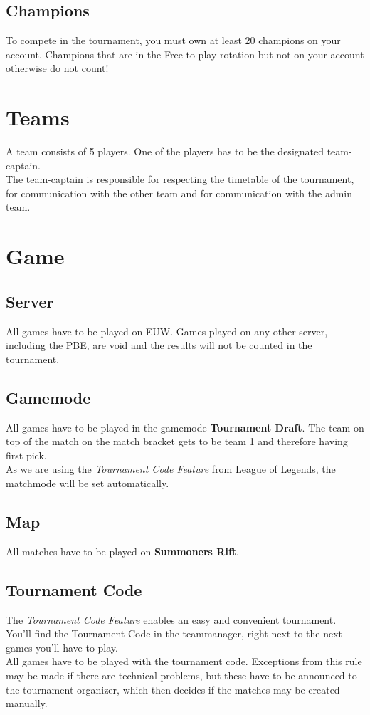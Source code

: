 \documentclass{article}
\begin{document}
\subsection{Champions}
To compete in the tournament, you must own at least 20 champions on your account. Champions that are in the Free-to-play rotation but not on your account otherwise do not count!


\section{Teams}
A team consists of 5 players. One of the players has to be the designated team-captain.
\\
The team-captain is responsible for respecting the timetable of the tournament, for communication with the other team and for communication with the admin team.

\section{Game}
\subsection{Server}
All games have to be played on EUW. Games played on any other server, including the PBE, are void and the results will not be counted in the tournament.

\subsection{Gamemode}
All games have to be played in the gamemode \textbf{Tournament Draft}. The team on top of the match on the match bracket gets to be team 1 and therefore having first pick. 
\\
As we are using the \textit{Tournament Code Feature} from League of Legends, the matchmode will be set automatically.
\subsection{Map}
All matches have to be played on \textbf{Summoners Rift}.

\subsection{Tournament Code}
The \textit{Tournament Code Feature} enables an easy and convenient tournament. You'll find the Tournament Code in the teammanager, right next to the next games you'll have to play. 
\\
All games have to be played with the tournament code. Exceptions from this rule may be made if there are technical problems, but these have to be announced to the tournament organizer, which then decides if the matches may be created manually.
\end{document}
